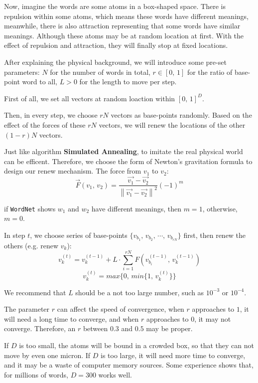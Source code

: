 \documentclass[11pt,a4paper]{article}
\begin{document}
Now, imagine the words are some atoms in a box-shaped space. There is repulsion within 
some atoms, which means these words have different meanings, meanwhile, there is also 
attraction representing that some words have similar meanings. Although these atoms may
be at random location at first. With the effect of repulsion and attraction, they will 
finally stop at fixed locations.

After explaining the physical background, we will introduce some pre-set parameters: 
$N$ for the number of words in total, $r\in [0,\,1]$ for the ratio of base-point word to all, 
$L>0$ for the length to move per step.

First of all, we set all vectors at random loaction within $[0,\,1]^{D}$. 

Then, in every 
step, we choose $rN$ vectors as base-points randomly. Based on the effect of the forces 
of these $rN$ vectors, we will renew the locations of the other $(1-r)N$ vectors.

Just like algorithm \textbf{Simulated Annealing}, to imitate the real physical world 
can be efficent. Therefore, we choose the form of Newton's gravitation formula to design 
our renew mechanism. The force from $v_{1}$ to $v_{2}$: 
$$\overrightarrow{F}(v_{1},\,v_{2})=\frac{\overrightarrow{v_{1}}-\overrightarrow{v_{2}}}{\left \| \overrightarrow{v_{1}}-\overrightarrow{v_{2}} \right \| ^{2}}(-1)^{m}$$

if \texttt{WordNet} shows $w_{1}$ and $w_{2}$ have different meanings, then $m=1$, 
otherwise, $m=0$.

In step $t$, we choose series of base-points $\{v_{b_{1}},\,v_{b_{2}},\,\cdots,\, v_{b_{rN}}\}$ first, 
then renew the others (e.g. renew $v_{k}$):
$$v_{k}^{(t)}=v_{k}^{(t-1)}+L\cdot\sum_{i=1}^{rN}F(v_{b_{i}}^{(t-1)},\,v_{k}^{(t-1)})$$
$$v_{k}^{(t)}=max\{0,\,min\{1,\,v_{k}^{(t)}\}\}$$

We recommend that $L$ should be a not too large number, such as $10^{-3}$ or $10^{-4}$.

The parameter $r$ can affect the speed of convergence, when $r$ approaches to $1$, it 
will need a long time to converge, and when $r$ approaches to $0$, it may not converge.
Therefore, an $r$ between $0.3$ and $0.5$ may be proper.

If $D$ is too small, the atoms will be bound in a crowded box, so that they can not move 
by even one micron. If $D$ is too large, it will need more time to converge, and it may be 
a waste of computer memory sources. Some experience shows that, for millions of words, 
$D=300$ works well.
\end{document}
